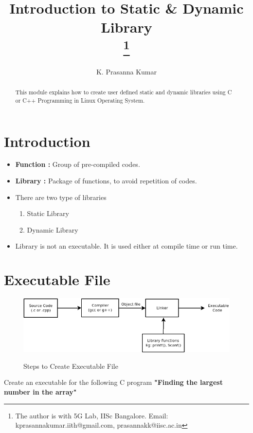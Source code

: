 \documentclass[conference]{IEEEtran}
\begin{document}
\title{Introduction to Static \& Dynamic Library\\
\thanks{The author is with 5G Lab, IISc Bangalore. Email: kprasannakumar.iith@gmail.com, prasannakk@iisc.ac.in}
}

\author{K. Prasanna Kumar}

\maketitle

\tableofcontents


\begin{abstract}
This module explains how to create user defined static and dynamic libraries using C or C++ Programming in Linux Operating System.
\end{abstract}


\section{Introduction}
\begin{itemize}
\item \textbf{Function :} Group of pre-compiled codes.
\item \textbf{Library :} Package of functions, to avoid repetition of codes.
\item There are two type of libraries
\begin{enumerate}
\item Static Library
\item Dynamic Library
\end{enumerate}
\item Library is not an executable. It is used either at compile time or run time.
\end{itemize}
\section{Executable File}
\begin{figure}[h!]
\centering
\includegraphics[scale=0.32]{img/exe_block.png}
\label{Steps to Create Executable File}
\caption{Steps to Create Executable File}
\end{figure}
\program
Create an executable for the following C program \textbf{"Finding the largest number in the array"}

\end{document}
